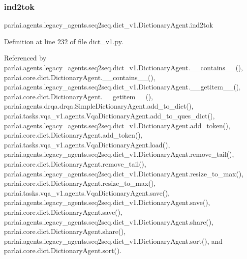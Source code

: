 \subsubsection{\texorpdfstring{ind2tok}{ind2tok}}
{\footnotesize\ttfamily parlai.\+agents.\+legacy\+\_\+agents.\+seq2seq.\+dict\+\_\+v1.\+Dictionary\+Agent.\+ind2tok}



Definition at line 232 of file dict\+\_\+v1.\+py.



Referenced by parlai.\+agents.\+legacy\+\_\+agents.\+seq2seq.\+dict\+\_\+v1.\+Dictionary\+Agent.\+\_\+\+\_\+contains\+\_\+\+\_\+(), parlai.\+core.\+dict.\+Dictionary\+Agent.\+\_\+\+\_\+contains\+\_\+\+\_\+(), parlai.\+agents.\+legacy\+\_\+agents.\+seq2seq.\+dict\+\_\+v1.\+Dictionary\+Agent.\+\_\+\+\_\+getitem\+\_\+\+\_\+(), parlai.\+core.\+dict.\+Dictionary\+Agent.\+\_\+\+\_\+getitem\+\_\+\+\_\+(), parlai.\+agents.\+drqa.\+drqa.\+Simple\+Dictionary\+Agent.\+add\+\_\+to\+\_\+dict(), parlai.\+tasks.\+vqa\+\_\+v1.\+agents.\+Vqa\+Dictionary\+Agent.\+add\+\_\+to\+\_\+ques\+\_\+dict(), parlai.\+agents.\+legacy\+\_\+agents.\+seq2seq.\+dict\+\_\+v1.\+Dictionary\+Agent.\+add\+\_\+token(), parlai.\+core.\+dict.\+Dictionary\+Agent.\+add\+\_\+token(), parlai.\+tasks.\+vqa\+\_\+v1.\+agents.\+Vqa\+Dictionary\+Agent.\+load(), parlai.\+agents.\+legacy\+\_\+agents.\+seq2seq.\+dict\+\_\+v1.\+Dictionary\+Agent.\+remove\+\_\+tail(), parlai.\+core.\+dict.\+Dictionary\+Agent.\+remove\+\_\+tail(), parlai.\+agents.\+legacy\+\_\+agents.\+seq2seq.\+dict\+\_\+v1.\+Dictionary\+Agent.\+resize\+\_\+to\+\_\+max(), parlai.\+core.\+dict.\+Dictionary\+Agent.\+resize\+\_\+to\+\_\+max(), parlai.\+tasks.\+vqa\+\_\+v1.\+agents.\+Vqa\+Dictionary\+Agent.\+save(), parlai.\+agents.\+legacy\+\_\+agents.\+seq2seq.\+dict\+\_\+v1.\+Dictionary\+Agent.\+save(), parlai.\+core.\+dict.\+Dictionary\+Agent.\+save(), parlai.\+agents.\+legacy\+\_\+agents.\+seq2seq.\+dict\+\_\+v1.\+Dictionary\+Agent.\+share(), parlai.\+core.\+dict.\+Dictionary\+Agent.\+share(), parlai.\+agents.\+legacy\+\_\+agents.\+seq2seq.\+dict\+\_\+v1.\+Dictionary\+Agent.\+sort(), and parlai.\+core.\+dict.\+Dictionary\+Agent.\+sort().

\mbox{\label{classparlai_1_1agents_1_1legacy__agents_1_1seq2seq_1_1dict__v1_1_1DictionaryAgent_a4611f1754758b004a33c806e5c650cf3}} 
